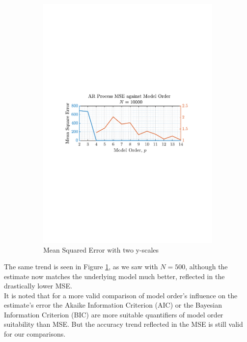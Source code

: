 \documentclass[12pt]{article}
\numberwithin{equation}{section}
\begin{document}
\begin{figure}[H]
\begin{subfigure}{0.49\textwidth}
			\includegraphics[trim={2.2cm 11.2cm 3cm  11.2cm}, clip, width=\textwidth]{../MATLAB/figures/q1_4c_fig16.pdf} 
			\captionsetup{justification=centering}
			\caption{Mean Squared Error with two y-scales}
		\end{subfigure}
		\captionsetup{justification=centering}
		\caption{}
		\label{fig: 1-4c}
	\end{figure}

	The same trend is seen in Figure \ref{fig: 1-4c}, as we saw with $N=500$, although the estimate now matches the underlying model much better, reflected in the drastically lower MSE. \\
	
	It is noted that for a more valid comparison of model order's influence on the estimate's error the Akaike Information Criterion (AIC) or the Bayesian Information Criterion (BIC) are more suitable quantifiers of model order suitability than MSE. But the accuracy trend reflected in the MSE is still valid for our comparisons.
	
\end{document}
